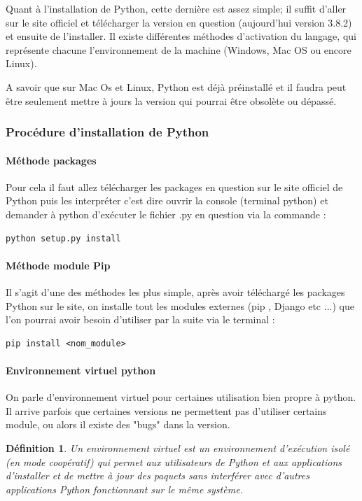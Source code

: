 \documentclass[a4paper, 12pt, twoside]{article}
\newtheorem{definition}{Définition}
\begin{document}
Quant à l'installation de Python, cette dernière est assez simple; il suffit d'aller sur le site officiel et télécharger la version en question (aujourd'hui version 3.8.2) et ensuite de l'installer. Il existe différentes méthodes d'activation du langage, qui représente chacune l'environnement de la machine (Windows, Mac OS ou encore Linux).\newline

A savoir que sur Mac Os et Linux, Python est déjà préinstallé et il faudra peut être seulement mettre à jours la version qui pourrai être obsolète ou dépassé.

\subsubsection{Procédure d'installation de Python} 
\paragraph{Méthode packages}{Pour cela il faut allez télécharger les packages en question sur le site officiel de Python puis les interpréter c'est dire ouvrir la console (terminal python) et demander à python d'exécuter le fichier \textsf{.py} en question via la commande :}
\begin{verbatim}
python setup.py install
\end{verbatim} 

\paragraph{Méthode module Pip} {Il s'agit d'une des méthodes les plus simple, après avoir téléchargé les packages Python sur le site, on installe tout les modules externes (pip , Django etc ...)  que l'on pourrai avoir besoin d'utiliser par la suite via le terminal : }
\begin{verbatim}
pip install <nom_module>
\end{verbatim}

\paragraph{Environnement virtuel python}{On parle d'environnement virtuel pour certaines utilisation bien propre à \textsf{python}. Il arrive parfois que certaines versions ne permettent pas d'utiliser certains module, ou alors il existe des "bugs" dans la version.}
\begin{definition}
Un environnement virtuel est un environnement d'exécution isolé (en mode coopératif) qui permet aux utilisateurs de Python et aux applications d'installer et de mettre à jour des paquets sans interférer avec d'autres applications Python fonctionnant sur le même système.
\end{definition}
\end{document}
